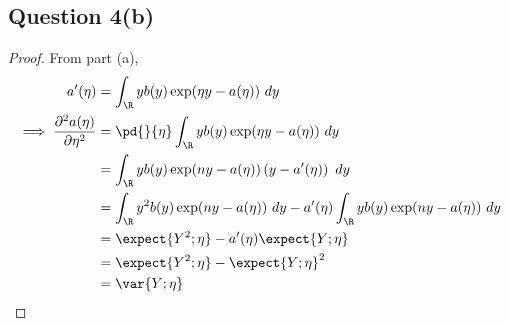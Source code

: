 \documentclass[11pt]{article}
\begin{document}
	\newpage
	\subsection{Question 4(b)}
	\begin{proof}
		From part (a),
		\begin{align}
			a'(\eta) &= \int_\R y b(y) \exp(\eta y - a(\eta))\ dy \\
			\implies \frac{\partial^2 a(\eta)}{\partial \eta^2} &= \pd{}{\eta} \int_\R y b(y) \exp(\eta y - a(\eta))\ dy \\
			&= \int_\R y b(y) \exp(ny - a(\eta)) \left (
				y - a'(\eta)
			\right)\ dy \\
			&= \int_\R y^2 b(y) \exp(ny - a(\eta))\ dy - a'(\eta) \int_\R y b(y) \exp(ny - a(\eta))\ dy \\
			&= \expect{Y^2; \eta} - a'(\eta) \expect{Y; \eta} \\
			&= \expect{Y^2; \eta} - \expect{Y; \eta}^2 \\
			&= \var{Y; \eta}
		\end{align}
	\end{proof}
	
	\newpage
\end{document}
